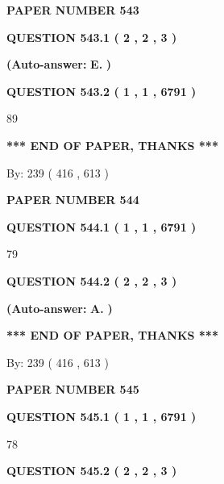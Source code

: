 \documentclass{ctexart}
\begin{document}
   
\newpage 
\setcounter{page}{ 
   543001 } 
   
   
 {\textbf{ \Large{ PAPER NUMBER  543  }}}
   
   
   
   
  
  
{\textbf{\large{QUESTION
543.1 
 ( 2 , 2 , 3 )
}}}
 
 
{\textbf{(Auto-answer:}}
{\textbf{\large{
E.}}}
{\textbf{)}}
 
 
  
  
{\textbf{\large{QUESTION
543.2 
 ( 1 , 1 , 6791 )
}}}

89
   
   
   
   
\vspace{1.0in} 
{\textbf{\large{ *** END OF PAPER, THANKS *** }}} 
   
   
\hspace{1.0in} By: 
 239 ( 416 ,  613 )
   
   
   
   
\newpage 
\setcounter{page}{ 
   544001 } 
   
   
 {\textbf{ \Large{ PAPER NUMBER  544  }}}
   
   
   
   
  
  
{\textbf{\large{QUESTION
544.1 
 ( 1 , 1 , 6791 )
}}}

79
  
  
{\textbf{\large{QUESTION
544.2 
 ( 2 , 2 , 3 )
}}}
 
 
{\textbf{(Auto-answer:}}
{\textbf{\large{
A.}}}
{\textbf{)}}
 
 
   
   
   
   
\vspace{1.0in} 
{\textbf{\large{ *** END OF PAPER, THANKS *** }}} 
   
   
\hspace{1.0in} By: 
 239 ( 416 ,  613 )
   
   
   
   
\newpage 
\setcounter{page}{ 
   545001 } 
   
   
 {\textbf{ \Large{ PAPER NUMBER  545  }}}
   
   
   
   
  
  
{\textbf{\large{QUESTION
545.1 
 ( 1 , 1 , 6791 )
}}}

78
  
  
{\textbf{\large{QUESTION
545.2 
 ( 2 , 2 , 3 )
}}}
 
\end{document}
